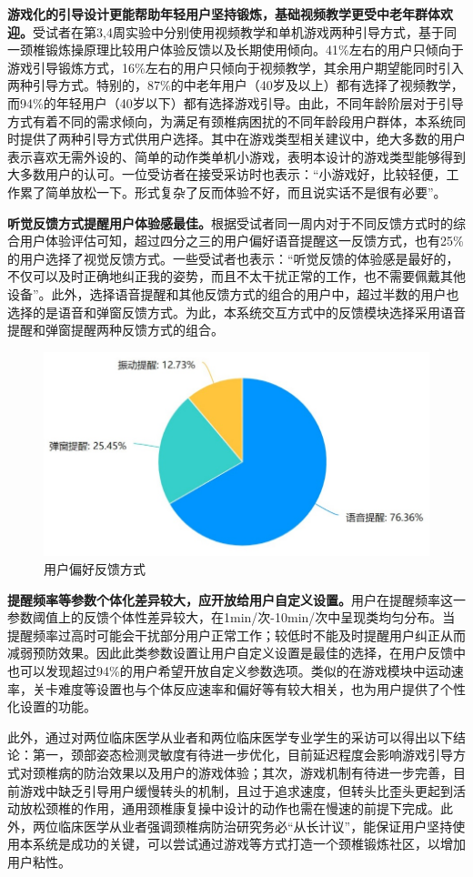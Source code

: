 \documentclass[12pt,a4paper]{article}%
\begin{document}
\textbf{游戏化的引导设计更能帮助年轻用户坚持锻炼，基础视频教学更受中老年群体欢迎。}受试者在第3,4周实验中分别使用视频教学和单机游戏两种引导方式，基于同一颈椎锻炼操原理比较用户体验反馈以及长期使用倾向。41\%左右的用户只倾向于游戏引导锻炼方式，16\%左右的用户只倾向于视频教学，其余用户期望能同时引入两种引导方式。特别的，87\%的中老年用户（40岁及以上）都有选择了视频教学，而94\%的年轻用户（40岁以下）都有选择游戏引导。由此，不同年龄阶层对于引导方式有着不同的需求倾向，为满足有颈椎病困扰的不同年龄段用户群体，本系统同时提供了两种引导方式供用户选择。其中在游戏类型相关建议中，绝大多数的用户表示喜欢无需外设的、简单的动作类单机小游戏，表明本设计的游戏类型能够得到大多数用户的认可。一位受访者在接受采访时也表示：“小游戏好，比较轻便，工作累了简单放松一下。形式复杂了反而体验不好，而且说实话不是很有必要”。


\textbf{听觉反馈方式提醒用户体验感最佳。}根据受试者同一周内对于不同反馈方式时的综合用户体验评估可知，超过四分之三的用户偏好语音提醒这一反馈方式，也有25\%的用户选择了视觉反馈方式。一些受试者也表示：“听觉反馈的体验感是最好的，不仅可以及时正确地纠正我的姿势，而且不太干扰正常的工作，也不需要佩戴其他设备”。此外，选择语音提醒和其他反馈方式的组合的用户中，超过半数的用户也选择的是语音和弹窗反馈方式。为此，本系统交互方式中的反馈模块选择采用语音提醒和弹窗提醒两种反馈方式的组合。

\begin{figure}[htbp]
\centering
\includegraphics[width=.6\textwidth]{./Part3-Design.pic/questionnaire5.png}
\caption{用户偏好反馈方式}
\end{figure}

\textbf{提醒频率等参数个体化差异较大，应开放给用户自定义设置。}用户在提醒频率这一参数阈值上的反馈个体性差异较大，在1min/次-10min/次中呈现类均匀分布。当提醒频率过高时可能会干扰部分用户正常工作；较低时不能及时提醒用户纠正从而减弱预防效果。因此此类参数设置让用户自定义设置是最佳的选择，在用户反馈中也可以发现超过94\%的用户希望开放自定义参数选项。类似的在游戏模块中运动速率，关卡难度等设置也与个体反应速率和偏好等有较大相关，也为用户提供了个性化设置的功能。

此外，通过对两位临床医学从业者和两位临床医学专业学生的采访可以得出以下结论：第一，颈部姿态检测灵敏度有待进一步优化，目前延迟程度会影响游戏引导方式对颈椎病的防治效果以及用户的游戏体验；其次，游戏机制有待进一步完善，目前游戏中缺乏引导用户缓慢转头的机制，且过于追求速度，但转头比歪头更起到活动放松颈椎的作用，通用颈椎康复操中设计的动作也需在慢速的前提下完成。此外，两位临床医学从业者强调颈椎病防治研究务必“从长计议”，能保证用户坚持使用本系统是成功的关键，可以尝试通过游戏等方式打造一个颈椎锻炼社区，以增加用户粘性。
\end{document}
